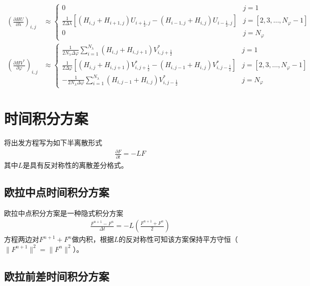 \documentclass{ctexart}
\begin{document}
\begin{align}
  \left( \frac{\partial H U}{\partial \lambda} \right)_{i,j} & \approx \left\{
    \begin{array}{ll}
      0 & j = 1 \\
      \frac{1}{2 \Delta{\lambda}} \left[ \left( H_{i,j} + H_{i+1,j} \right) U_{i+\frac{1}{2},j} - \left( H_{i-1,j} + H_{i,j} \right) U_{i-\frac{1}{2},j} \right] & j = [2, 3, \dots, N_\varphi - 1] \\
      0 & j = N_\varphi
    \end{array}
  \right. \\
  \left( \frac{\partial H V^*}{\partial \varphi} \right)_{i,j} & \approx \left\{
    \begin{array}{ll}
      \frac{1}{2 N_\lambda \Delta{\varphi}} \sum_{i = 1}^{N_\lambda} \left( H_{i,j} + H_{i,j+1} \right) V_{i,j+\frac{1}{2}}^* & j = 1 \\
      \frac{1}{2 \Delta{\varphi}} \left[ \left( H_{i,j} + H_{i,j+1} \right) V_{i,j+\frac{1}{2}}^* - \left( H_{i,j-1} + H_{i,j} \right) V_{i,j-\frac{1}{2}}^* \right] & j = [2, 3, \dots, N_\varphi - 1] \\
      - \frac{1}{2 N_\lambda \Delta{\varphi}} \sum_{i = 1}^{N_\lambda} \left( H_{i,j-1} + H_{i,j} \right) V_{i,j-\frac{1}{2}}^* & j = N_\varphi
    \end{array}
  \right.
\end{align}

\section{时间积分方案}

将出发方程写为如下半离散形式
\begin{align}
  \frac{\partial F}{\partial t} = - L F
\end{align}
其中$L$是具有反对称性的离散差分格式。

\subsection{欧拉中点时间积分方案}

欧拉中点积分方案是一种隐式积分方案
\begin{align}
  \frac{F^{n+1} - F^n}{\Delta{t}} = - L \left( \frac{F^{n+1} + F^n}{2} \right)
\end{align}
方程两边对$F^{n+1} + F^n$做内积，根据$L$的反对称性可知该方案保持平方守恒（$\lVert F^{n+1} \rVert^2 = \lVert F^n \rVert^2$）。

\subsection{欧拉前差时间积分方案}
\end{document}
